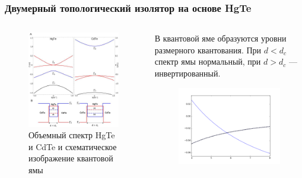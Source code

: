 \documentclass{beamer}
\begin{document}
\begin{frame}
    \frametitle{Двумерный топологический изолятор на основе HgTe}
    \begin{columns}[T]
        \begin{column}{0.5\textwidth}
            \begin{figure}[h]
                \includegraphics[width=0.95\linewidth]{quantum_well.png}
                \caption{Объемный спектр HgTe и CdTe и 
                         схематическое изображение квантовой ямы}
            \end{figure}
        \end{column}
        \begin{column}{0.5\textwidth}
            В квантовой яме образуются уровни размерного квантования. При
            $d < d_c$ спектр ямы нормальный, при $d > d_c$ --- 
            инвертированный.
            \begin{figure}
                \includegraphics[width=0.95\linewidth]{levels.png}

\end{figure}
\end{column}
\end{columns}
\end{frame}
\end{document}
